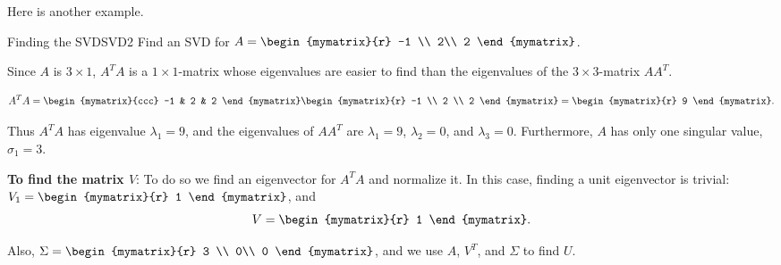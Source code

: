 Here is another example. 

\begin{example}{Finding the SVD}{SVD2}
Find an SVD for
$A=\begin{mymatrix}{r} -1 \\ 2\\ 2 \end{mymatrix}$.
\end{example}

\begin{solution}
Since $A$ is $3\times 1$, $A^T A$ is a $1\times 1$-matrix
whose eigenvalues are easier to find than the eigenvalues of
the $3\times 3$-matrix $AA^T$.

\[ A^TA=\begin{mymatrix}{ccc} -1 & 2 & 2 \end{mymatrix}
\begin{mymatrix}{r} -1 \\ 2 \\ 2 \end{mymatrix}
=\begin{mymatrix}{r} 9 \end{mymatrix}.\]

Thus $A^TA$ has eigenvalue $\lambda_1=9$, and
the eigenvalues of $AA^T$ are $\lambda_1=9$, $\lambda_2=0$, and
$\lambda_3=0$. 
Furthermore, $A$ has only one singular value, $\sigma_1=3$.

{\bf To find the matrix $V$}:
To do so we find an eigenvector for $A^TA$ and
normalize it.
In this case, finding a unit eigenvector is trivial:
$V_1=\begin{mymatrix}{r} 1 \end{mymatrix}$, and
\[ V=\begin{mymatrix}{r} 1 \end{mymatrix}.\]

Also,
$\Sigma =\begin{mymatrix}{r} 3 \\ 0\\ 0 \end{mymatrix}$,
and we use $A$, $V^T$, and $\Sigma$ to find $U$.



\end{solution}
